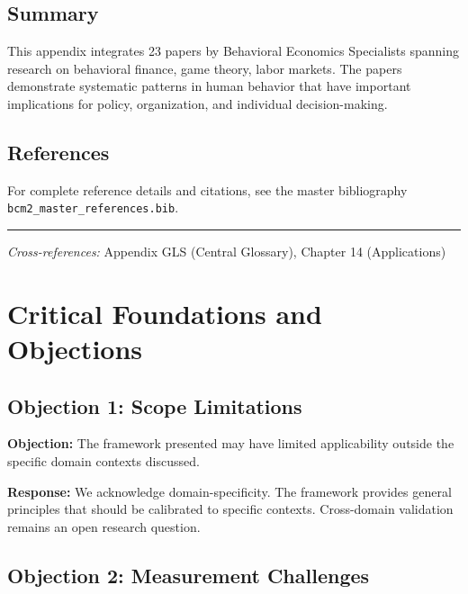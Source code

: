 \subsection{Summary}

This appendix integrates 23 papers by Behavioral Economics Specialists
spanning research on behavioral finance, game theory, labor markets.
The papers demonstrate systematic patterns in human behavior that have important
implications for policy, organization, and individual decision-making.

\subsection{References}

For complete reference details and citations, see the master bibliography
\texttt{bcm2\_master\_references.bib}.

\vspace{1em}
\hrule
\vspace{0.5em}

\noindent\textit{Cross-references:}
Appendix GLS (Central Glossary), Chapter 14 (Applications)



\section{Critical Foundations and Objections}
\label{sec:spc-foundations}

\subsection{Objection 1: Scope Limitations}

\textbf{Objection:} The framework presented may have limited applicability
outside the specific domain contexts discussed.

\textbf{Response:} We acknowledge domain-specificity. The framework provides
general principles that should be calibrated to specific contexts. Cross-domain
validation remains an open research question.

\subsection{Objection 2: Measurement Challenges}


